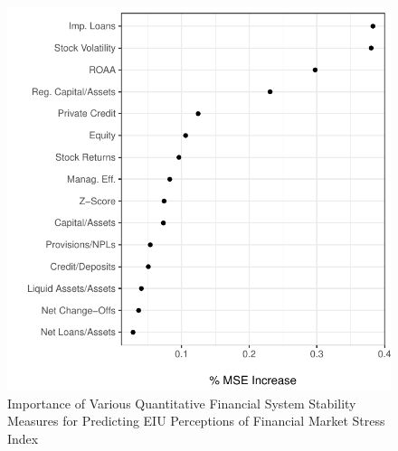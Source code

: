 \documentclass[]{article}
\begin{document}
\begin{figure}
    \caption{Importance of Various Quantitative Financial System Stability Measures for Predicting EIU Perceptions of Financial Market Stress Index}
    \label{rf_var_importance}
    \begin{center}
        \includegraphics[scale=0.5]{figures/rf_variable_imp.pdf}
    \end{center}
\end{figure}
\end{document}
